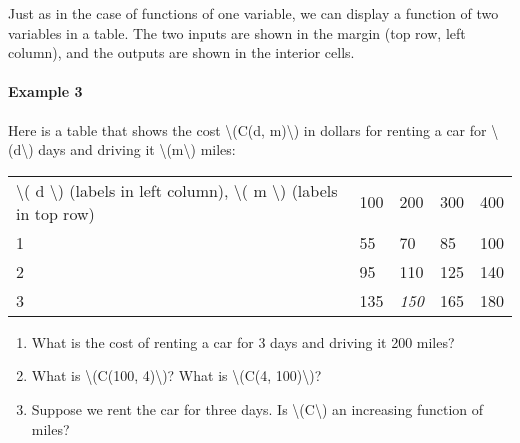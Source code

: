 Just as in the case of functions of one variable, we can display a
function of two variables in a table. The two inputs are shown in the
margin (top row, left column), and the outputs are shown in the interior
cells.

\hypertarget{example-3}{%
\paragraph{Example 3}\label{example-3}}

Here is a table that shows the cost \textbackslash{}(C(d,
m)\textbackslash{}) in dollars for renting a car for
\textbackslash{}(d\textbackslash{}) days and driving it
\textbackslash{}(m\textbackslash{}) miles:

\begin{longtable}[]{@{}lllll@{}}
\toprule
\endhead
\textbackslash{}( d \textbackslash{}) (labels in left column),
\textbackslash{}( m \textbackslash{}) (labels in top row) & 100 & 200 &
300 & 400\tabularnewline
1 & 55 & 70 & 85 & 100\tabularnewline
2 & 95 & 110 & 125 & 140\tabularnewline
3 & 135 & \emph{150} & 165 & 180\tabularnewline
\bottomrule
\end{longtable}

\begin{enumerate}
\tightlist
\item
  What is the cost of renting a car for 3 days and driving it 200 miles?
\item
  What is \textbackslash{}(C(100, 4)\textbackslash{})? What is
  \textbackslash{}(C(4, 100)\textbackslash{})?
\item
  Suppose we rent the car for three days. Is
  \textbackslash{}(C\textbackslash{}) an increasing function of miles?
\end{enumerate}


